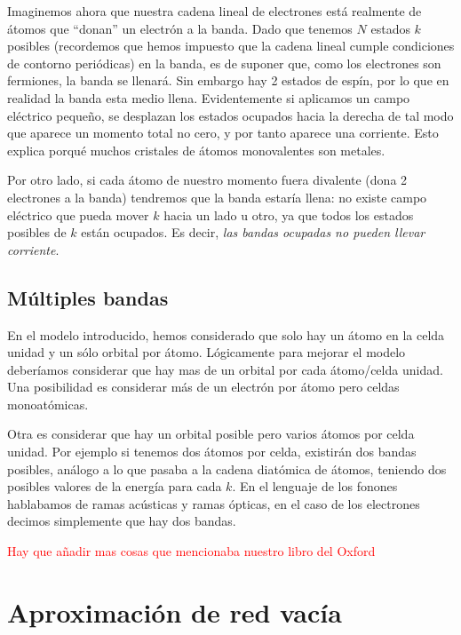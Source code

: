 Imaginemos ahora que nuestra cadena lineal de electrones está realmente de átomos que ``donan'' un electrón a la banda. Dado que tenemos $N$ estados $k$ posibles (recordemos que hemos impuesto que la cadena lineal cumple condiciones de contorno periódicas) en la banda, es de suponer que, como los electrones son fermiones, la banda se llenará. Sin embargo hay 2 estados de espín, por lo que en realidad la banda esta medio llena. Evidentemente si aplicamos un campo eléctrico pequeño, se desplazan los estados ocupados hacia la derecha de tal modo que aparece un momento total no cero, y por tanto aparece una corriente. Esto explica porqué muchos cristales de átomos monovalentes son metales.

Por otro lado, si cada átomo de nuestro momento fuera divalente (dona 2 electrones a la banda) tendremos que la banda estaría llena: no existe campo eléctrico que pueda mover $k$ hacia un lado u otro, ya que todos los estados posibles de $k$ están ocupados. Es decir, \textit{las bandas ocupadas no pueden llevar corriente}.


\subsection{Múltiples bandas}

En el modelo introducido, hemos considerado que solo hay un átomo en la celda unidad y un sólo orbital por átomo. Lógicamente para mejorar el modelo deberíamos considerar que hay mas de un orbital por cada átomo/celda unidad. Una posibilidad es considerar más de un electrón por átomo pero celdas monoatómicas. 

Otra es considerar que hay un orbital posible pero varios átomos por celda unidad. Por ejemplo si tenemos dos átomos por celda, existirán dos bandas posibles, análogo a lo que pasaba a la cadena diatómica de átomos, teniendo dos posibles valores de la energía para cada $k$. En el lenguaje de los fonones hablabamos de ramas acústicas y ramas ópticas, en el caso de los electrones decimos simplemente que hay dos bandas.

\begin{Anotacion}
	\textcolor{red}{Hay que añadir mas cosas que mencionaba nuestro libro del Oxford}
\end{Anotacion}	

\section{Aproximación de red vacía}

